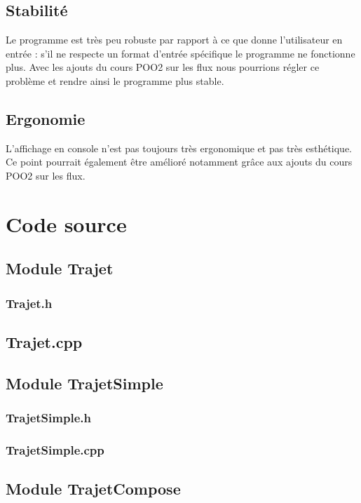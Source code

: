 \documentclass[10pt,a4paper,twoside]{article}
\begin{document}
\subsection{Stabilité}
Le programme est très peu robuste par rapport à ce que donne l'utilisateur en entrée : s'il ne respecte un format d'entrée spécifique le programme ne fonctionne plus. Avec les ajouts du cours POO2 sur les flux nous pourrions régler ce problème et rendre ainsi le programme plus stable.

\subsection{Ergonomie}
L'affichage en console n'est pas toujours très ergonomique et pas très esthétique. Ce point pourrait également être amélioré notamment grâce aux ajouts du cours POO2 sur les flux.

\newpage
\section{Code source}

\subsection{Module Trajet}
\subsubsection{Trajet.h}


\newpage
\subsection{Trajet.cpp}


\newpage
\subsection{Module TrajetSimple}
\subsubsection{TrajetSimple.h}


\newpage
\subsubsection{TrajetSimple.cpp}


\newpage
\subsection{Module TrajetCompose}
\end{document}
